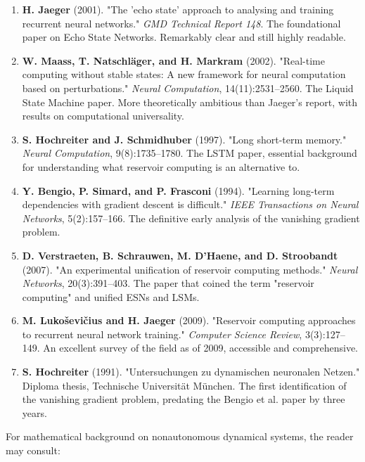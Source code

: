 \begin{enumerate}[nosep]
  \item \textbf{H. Jaeger} (2001). "The 'echo state' approach to analysing and training recurrent neural networks." \textit{GMD Technical Report 148}. The foundational paper on Echo State Networks. Remarkably clear and still highly readable.

  \item \textbf{W. Maass, T. Natschläger, and H. Markram} (2002). "Real-time computing without stable states: A new framework for neural computation based on perturbations." \textit{Neural Computation}, 14(11):2531--2560. The Liquid State Machine paper. More theoretically ambitious than Jaeger's report, with results on computational universality.

  \item \textbf{S. Hochreiter and J. Schmidhuber} (1997). "Long short-term memory." \textit{Neural Computation}, 9(8):1735--1780. The LSTM paper, essential background for understanding what reservoir computing is an alternative to.

  \item \textbf{Y. Bengio, P. Simard, and P. Frasconi} (1994). "Learning long-term dependencies with gradient descent is difficult." \textit{IEEE Transactions on Neural Networks}, 5(2):157--166. The definitive early analysis of the vanishing gradient problem.

  \item \textbf{D. Verstraeten, B. Schrauwen, M. D'Haene, and D. Stroobandt} (2007). "An experimental unification of reservoir computing methods." \textit{Neural Networks}, 20(3):391--403. The paper that coined the term "reservoir computing" and unified ESNs and LSMs.

  \item \textbf{M. Lukoševičius and H. Jaeger} (2009). "Reservoir computing approaches to recurrent neural network training." \textit{Computer Science Review}, 3(3):127--149. An excellent survey of the field as of 2009, accessible and comprehensive.

  \item \textbf{S. Hochreiter} (1991). "Untersuchungen zu dynamischen neuronalen Netzen." Diploma thesis, Technische Universität München. The first identification of the vanishing gradient problem, predating the Bengio et al. paper by three years.
\end{enumerate}

For mathematical background on nonautonomous dynamical systems, the reader may consult:

